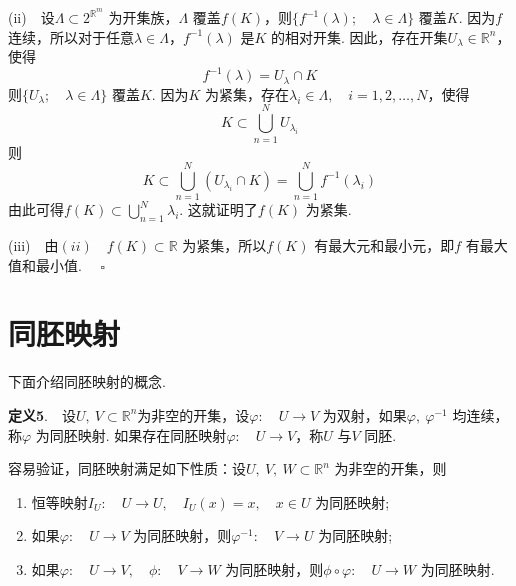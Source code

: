 \documentclass{article}
\begin{document}
(ii)\ \ 设\(\Lambda \subset 2^{\mathbb{R}^{m}}\) 为开集族，\(\Lambda \) 覆盖\(f(K) \)，则\(\{f^{-1}(\lambda );\quad \lambda \in \Lambda  \} \) 覆盖\(K\). 因为\(f\) 连续，所以对于任意\(\lambda \in \Lambda \)，\(f^{-1}(\lambda ) \) 是\(K\) 的相对开集. 因此，存在开集\(U_{\lambda }\in \mathbb{R}^n\)，使得
\begin{equation*}
    f^{-1}(\lambda ) = U_{\lambda }\cap K
\end{equation*}
则\(\{U_{\lambda };\quad \lambda \in \Lambda\}  \) 覆盖\(K\). 因为\(K\) 为紧集，存在\(\lambda_{i}\in \Lambda ,\quad i = 1,2,\dots ,N\)，使得
\begin{equation*}
    K \subset \bigcup_{n=1}^{N} U_{\lambda _{i}}
\end{equation*}
则
\begin{equation*}
    K \subset \bigcup_{n=1}^{N} \left( U_{\lambda _{i}}\cap K \right) = \bigcup_{n=1}^{N}f^{-1}(\lambda _{i})
\end{equation*}
由此可得\(f(K)\subset \bigcup_{n=1}^{N} \lambda _{i}\). 这就证明了\(f(K) \) 为紧集.

(iii)\ \ 由\((ii)\)\ \ \(f(K) \subset \mathbb{R}\) 为紧集，所以\(f(K) \) 有最大元和最小元，即\(f\) 有最大值和最小值. \(\quad \square\)

\newpage

\section{同胚映射}
下面介绍同胚映射的概念.

\vspace{10pt}

\textbf{定义5}.\ \ 设\(U,\ V \subset \mathbb{R}^n\)为非空的开集，设\(\varphi:\quad U \to V \) 为双射，如果\(\varphi ,\ \varphi ^{ - 1}\) 均连续，称\(\varphi \) 为同胚映射. 如果存在同胚映射\(\varphi :\quad U \to V\)，称\(U\) 与\(V\) 同胚.

\vspace{10pt}

容易验证，同胚映射满足如下性质：设\(U,\ V,\ W \subset \mathbb{R}^n\) 为非空的开集，则
\begin{enumerate}
    \item 恒等映射\(I_{U}:\quad U \to U,\quad I_{U}(x) = x,\quad x \in U\) 为同胚映射;
    \item 如果\(\varphi :\quad U \to V\) 为同胚映射，则\(\varphi ^{ - 1}:\quad V \to U\) 为同胚映射;
    \item 如果\(\varphi: \quad U \to V,\quad \phi:\quad V \to W\) 为同胚映射，则\(\phi \circ \varphi :\quad U \to W\) 为同胚映射.
\end{enumerate}
\end{document}
